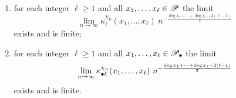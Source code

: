 \documentclass[12pt,usenames,dvipsnames,svgnames,table]{amsart}
\begin{document}
\begin{theorem}
\begin{enumerate}[label=(\emph{\alph*})]
\begin{enumerate}[label=(\emph{\Alph*})]
			
			\item 
			\label{item:cumulants-classic-polynomial}
			for each integer $\ell\geq 1$ and all $x_1,\dots,x_\ell\in\mathscr{P}$ the limit
			\begin{equation} 
			\label{eq:AFPCumulants}
			\lim_{n\to\infty}    \kappa^{\chi_n}_{\ell}(x_{1},\dots,x_{\ell})\ 
			n^{- \frac{\deg x_1+ \cdots + \deg x_\ell - 2(\ell-1)}{2}} 
			\end{equation}
			exists and is finite;
			
			
			
			\item 
			\label{item:disjoint-cumulants}
			for each integer $\ell\geq 1$ and all $x_1,\dots,x_\ell\in\mathscr{P}_\bullet$ the limit
			\begin{equation} 
			\label{eq:AFPDisjointCumulants}
			\lim_{n\to\infty}    \kappa^{\chi_n}_{\disjoint \ell}(x_{1},\dots,x_{\ell})\ 
			n^{- \frac{\deg x_1+ \cdots + \deg x_\ell - 2(\ell-1)}{2}} 
			\end{equation}
			exists and is finite.
			
			
			
		\end{enumerate}
		
		
		
		

\end{enumerate}
\end{theorem}
\end{document}
